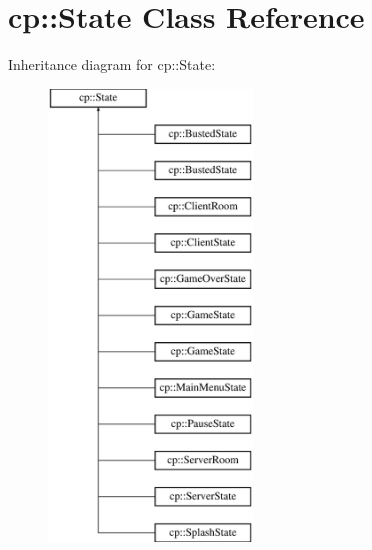 \hypertarget{classcp_1_1_state}{}\section{cp\+:\+:State Class Reference}
\label{classcp_1_1_state}
Inheritance diagram for cp\+:\+:State\+:\begin{figure}[H]
\begin{center}
\leavevmode
\includegraphics[height=12.000000cm]{classcp_1_1_state}
\end{center}
\end{figure}
